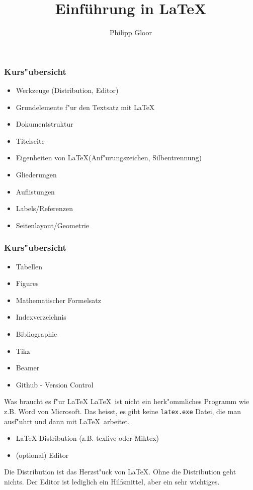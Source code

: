\documentclass[10pt, xcolor={table}]{beamer}
\title[Einführung in \LaTeX] %
{Einführung in \LaTeX}
\author{Philipp Gloor}
\institute[] %
{philipp.gloor@gmail.com}
\date[Feburar 2016] %
\newlength{\wideitemsep}
\let\olditem\item
\renewcommand{\item}{\setlength{\itemsep}{\wideitemsep}\olditem}
\newcommand{\ltx}{\LaTeX}
\begin{document}
\begin{frame}
  \titlepage
\end{frame}

\begin{frame}[t]\frametitle{Kurs"ubersicht}
    
\begin{itemize}
  \item Werkzeuge (Distribution, Editor)
  \item Grundelemente f"ur den Textsatz mit \ltx
  \item Dokumentstruktur
  \item Titelseite
  \item Eigenheiten von \ltx (Anf"urungszeichen, Silbentrennung)
  \item Gliederungen
  \item Auflistungen
  \item Labels/Referenzen
  \item Seitenlayout/Geometrie
\end{itemize}
\end{frame}

\begin{frame}[t]\frametitle{Kurs"ubersicht}
    
\begin{itemize}
  \item Tabellen
  \item Figures
  \item Mathematischer Formelsatz
  \item Indexverzeichnis
  \item Bibliographie
  \item Tikz
  \item Beamer
  \item Github - Version Control
  \end{itemize}
\end{frame}

\begin{frame}{Was braucht es f"ur \LaTeX}
\LaTeX\  ist nicht ein herk"ommliches Programm wie z.B. Word von Microsoft. Das heisst, es gibt keine
\texttt{latex.exe} Datei, die man ausf"uhrt und dann mit \LaTeX\ arbeitet.
\begin{itemize}
  \item \LaTeX-Distribution (z.B. texlive oder Miktex)
  \item (optional) Editor
\end{itemize}

Die Distribution ist das Herzst"uck von \LaTeX. Ohne die Distribution geht nichts. Der Editor
ist lediglich ein Hilfsmittel, aber ein sehr wichtiges.
\end{frame}
\end{document}
